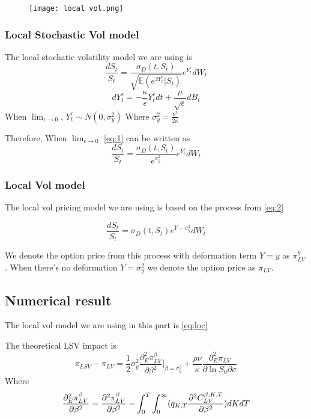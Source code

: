 \documentclass[12pt]{article}
\numberwithin{equation}{section}
\newcommand{\E}{\mathbb{E}}
\begin{document}
\begin{figure}[h]
    \texttt{[image: local vol.png]}
    \label{fig:LVsurface}
\end{figure}
\subsubsection{Local Stochastic Vol model}
The local stochatic volatility model we are using is
\begin{equation} \label{eq:1}
    \frac{dS_t}{S_t}=\frac{\sigma_D(t,S_t)}{\sqrt{\E(e^{2Y_t^\epsilon}|S_t)}}e^{Y_t^\epsilon}dW_t
\end{equation} 
\[
    dY_t^\epsilon=-\frac \kappa \epsilon Y_t^\epsilon dt + \frac{\mu}{\sqrt{\epsilon}}dB_t
\]
When $\lim_{\epsilon \to 0}$, $Y_t^\epsilon\sim N(0,\sigma_y^2)$ Where $\sigma_y^2=\frac{\nu^2}{2\kappa}$

Therefore, When $\lim_{\epsilon \to 0}$ \ref{eq:1} can be written as
\begin{equation} \label{eq:2}
    \frac{dS_t}{S_t}=\frac{\sigma_D(t,S_t)}{e^{\sigma_y^2}}e^{Y_t^\epsilon}dW_t
\end{equation} 

\subsubsection{Local Vol model}
The local vol pricing model we are using is based on the process from \ref{eq:2}

\begin{equation} \label{eq:loc}
    \frac{dS_t}{S_t}=\sigma_D(t,S_t)e^{Y-\sigma_y^2}dW_t
\end{equation}

We denote the option price from this process with deformation term $Y=y$ 
as $\pi_{LV}^y$. When there's no deformation $Y=\sigma_y^2$ we denote the option price
as $\pi_{LV}$.

\subsection{Numerical result}
The local vol model we are using in this part is \ref{eq:loc}

The theoretical LSV impact is 
\begin{equation} \label{eq:3}
    \pi_{LSV}-\pi_{LV}=\frac 1 2 \sigma^2_y \frac{\partial_E^2 \pi^\beta_{LV}}{\partial \beta^2}|_{\beta=\sigma^2_y}
    +\frac{\rho \nu}{\kappa}\frac{\partial_E^2 \pi_{LV}}{\partial \ln S_0\partial \sigma}
\end{equation} 
Where
\begin{equation} \label{eq:4}
    \frac{\partial_E^2 \pi^\beta_{LV}}{\partial \beta^2}=\frac{\partial^2 \pi^\beta_{LV}}{\partial \beta^2}
    -\int_0^T\int_0^\infty (q_{K,T}\frac{\partial^2 C^{\beta,K,T}_{LV}}{\partial \beta^2})dKdT\\
\end{equation} 
\end{document}
